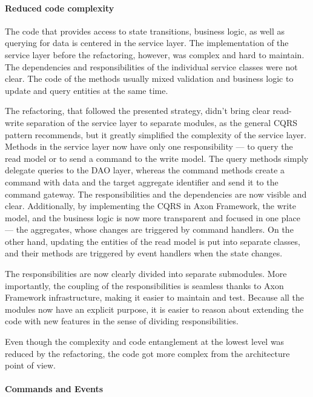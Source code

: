 \documentclass{book}
\begin{document}
\paragraph{Reduced code complexity}\label{reduced-code-complexity}

The code that provides access to state transitions, business logic, as
well as querying for data is centered in the service layer. The
implementation of the service layer before the refactoring, however, was
complex and hard to maintain. The dependencies and responsibilities of
the individual service classes were not clear. The code of the methods
usually mixed validation and business logic to update and query entities
at the same time.

The refactoring, that followed the presented strategy, didn't bring
clear read-write separation of the service layer to separate modules, as
the general CQRS pattern recommends, but it greatly simplified the
complexity of the service layer. Methods in the service layer now have
only one responsibility --- to query the read model or to send a command
to the write model. The query methods simply delegate queries to the DAO
layer, whereas the command methods create a command with data and the
target aggregate identifier and send it to the command gateway. The
responsibilities and the dependencies are now visible and clear.
Additionally, by implementing the CQRS in Axon Framework, the write
model, and the business logic is now more transparent and focused in one
place --- the aggregates, whose changes are triggered by command
handlers. On the other hand, updating the entities of the read model
is put into separate classes, and their methods are triggered by event
handlers when the state changes.

The responsibilities are now clearly divided into separate submodules.
More importantly, the coupling of the responsibilities is seamless
thanks to Axon Framework infrastructure, making it easier to maintain
and test. Because all the modules now have an explicit purpose, it is
easier to reason about extending the code with new features in the sense
of dividing responsibilities.

Even though the complexity and code entanglement at the lowest level was
reduced by the refactoring, the code got more complex from the
architecture point of view.

\paragraph{Commands and Events}\label{commands-and-events}
\end{document}
